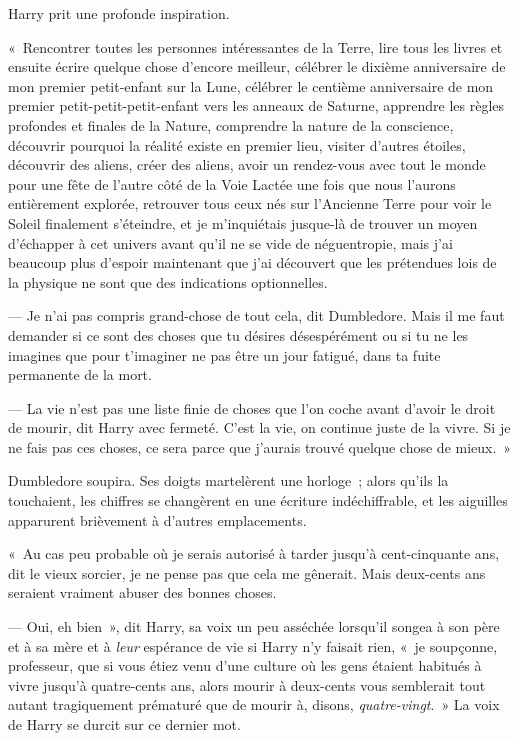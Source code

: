 Harry prit une profonde inspiration.

«~Rencontrer toutes les personnes intéressantes de la Terre, lire tous les livres et ensuite écrire quelque chose d'encore meilleur, célébrer le dixième anniversaire de mon premier petit-enfant sur la Lune, célébrer le centième anniversaire de mon premier petit-petit-petit-enfant vers les anneaux de Saturne, apprendre les règles profondes et finales de la Nature, comprendre la nature de la conscience, découvrir pourquoi la réalité existe en premier lieu, visiter d'autres étoiles, découvrir des aliens, créer des aliens, avoir un rendez-vous avec tout le monde pour une fête de l'autre côté de la Voie Lactée une fois que nous l'aurons entièrement explorée, retrouver tous ceux nés sur l'Ancienne Terre pour voir le Soleil finalement s'éteindre, et je m'inquiétais jusque-là de trouver un moyen d'échapper à cet univers avant qu'il ne se vide de néguentropie, mais j'ai beaucoup plus d'espoir maintenant que j'ai découvert que les prétendues lois de la physique ne sont que des indications optionnelles.

--- Je n'ai pas compris grand-chose de tout cela, dit Dumbledore.
Mais il me faut demander si ce sont des choses que tu désires désespérément ou si tu ne les imagines que pour t'imaginer ne pas être un jour fatigué, dans ta fuite permanente de la mort.

--- La vie n'est pas une liste finie de choses que l'on coche avant d'avoir le droit de mourir, dit Harry avec fermeté.
C'est la vie, on continue juste de la vivre.
Si je ne fais pas ces choses, ce sera parce que j'aurais trouvé quelque chose de mieux.~»

Dumbledore soupira.
Ses doigts martelèrent une horloge~; alors qu'ils la touchaient, les chiffres se changèrent en une écriture indéchiffrable, et les aiguilles apparurent brièvement à d'autres emplacements.

«~Au cas peu probable où je serais autorisé à tarder jusqu'à cent-cinquante ans, dit le vieux sorcier, je ne pense pas que cela me gênerait.
Mais deux-cents ans seraient vraiment abuser des bonnes choses.

--- Oui, eh bien~», dit Harry, sa voix un peu asséchée lorsqu'il songea à son père et à sa mère et à \emph{leur} espérance de vie si Harry n'y faisait rien, «~je soupçonne, professeur, que si vous étiez venu d'une culture où les gens étaient habitués à vivre jusqu'à quatre-cents ans, alors mourir à deux-cents vous semblerait tout autant tragiquement prématuré que de mourir à, disons, \emph{quatre-vingt}.~»
La voix de Harry se durcit sur ce dernier mot.

